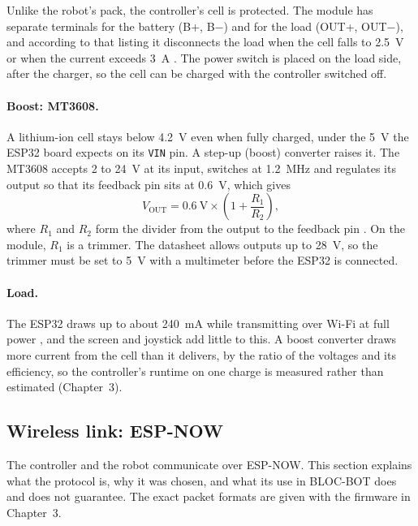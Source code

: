 Unlike the robot's pack, the controller's cell is protected. The module has separate
terminals for the battery (B+, B$-$) and for the load (OUT+, OUT$-$), and according to
that listing it disconnects the load when the cell falls to 2.5~V or when the current
exceeds 3~A \cite{esp32lab_tp4056}. The power switch is placed on the load side, after
the charger, so the cell can be charged with the controller switched off.

\paragraph{Boost: MT3608.} A lithium-ion cell stays below 4.2~V even when fully charged,
under the 5~V the ESP32 board expects on its \texttt{VIN} pin. A step-up (boost) converter raises
it. The MT3608 accepts 2 to 24~V at its input, switches at 1.2~MHz and regulates its
output so that its feedback pin sits at 0.6~V, which gives
\begin{equation}
  V_{\text{OUT}} = 0.6~\text{V} \times \left(1 + \frac{R_1}{R_2}\right),
\end{equation}
where \(R_1\) and \(R_2\) form the divider from the output to the feedback pin
\cite{mt3608_datasheet}. On the module, \(R_1\) is a trimmer. The datasheet allows outputs
up to 28~V, so the trimmer must be set to 5~V with a multimeter before the ESP32 is connected.

\paragraph{Load.} The ESP32 draws up to about 240~mA while transmitting over Wi-Fi at
full power \cite{esp32_datasheet}, and the screen and joystick add little to this. A
boost converter draws more current from the cell than it delivers, by the ratio of the
voltages and its efficiency, so the controller's runtime on one charge is measured
rather than estimated (Chapter~3).

\subsection{Wireless link: ESP-NOW}
\label{sec:espnow}
The controller and the robot communicate over ESP-NOW. This section explains what the
protocol is, why it was chosen, and what its use in BLOC-BOT does and does not guarantee.
The exact packet formats are given with the firmware in Chapter~3.

